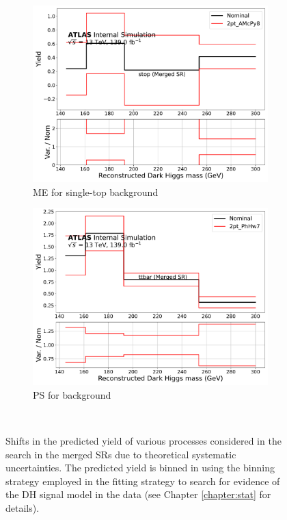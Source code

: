 \begin{figure}[!tb]
  \begin{subfigure}{0.45\textwidth}
    \includegraphics[width=\textwidth]{Figures/6/2pt_AMcPy8_syst_stop_SR_mgd_TARJets10_minmS_mgd_yield.pdf}
    \caption{ME for single-top background}\label{fig:stop_ME}
    \end{subfigure} \hspace{1em}
   \begin{subfigure}{0.45\textwidth}
    \includegraphics[width=\textwidth]{Figures/6/2pt_PhHw7_syst_ttbar_SR_mgd_TARJets10_minmS_mgd_yield.pdf}
    \caption{PS for \ttbar background}\label{fig:ttbar_PS}
  \end{subfigure} \\ \vspace{1em}
    \caption{Shifts in the predicted yield of various processes considered in the search in the merged SRs due to theoretical systematic uncertainties. The predicted yield is binned in \minms using the binning strategy employed in the fitting strategy to search for evidence of the DH signal model in the data (see Chapter \ref{chapter:stat} for details). }
  \label{fig:theory_systs}
  \end{figure}
  

